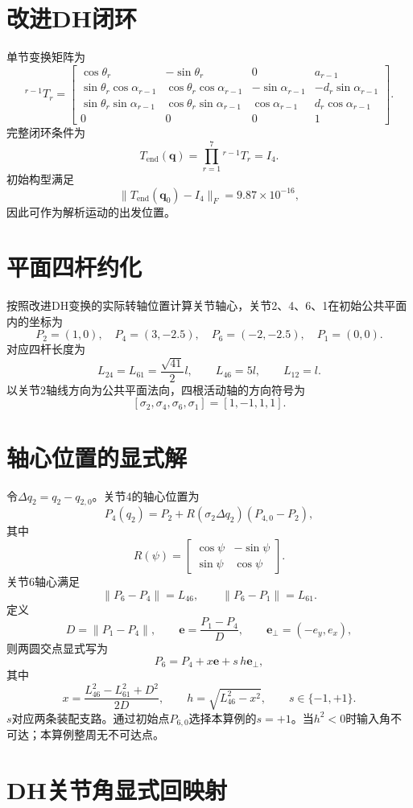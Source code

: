 \documentclass[UTF8,12pt,a4paper]{ctexart}
\begin{document}
\section{改进DH闭环}

单节变换矩阵为
\[
{}^{r-1}T_r=
\begin{bmatrix}
\cos\theta_r&-\sin\theta_r&0&a_{r-1}\\
\sin\theta_r\cos\alpha_{r-1}&\cos\theta_r\cos\alpha_{r-1}&-\sin\alpha_{r-1}&-d_r\sin\alpha_{r-1}\\
\sin\theta_r\sin\alpha_{r-1}&\cos\theta_r\sin\alpha_{r-1}&\cos\alpha_{r-1}&d_r\cos\alpha_{r-1}\\
0&0&0&1
\end{bmatrix}.
\]
完整闭环条件为
\[
T_{\mathrm{end}}(\bm q)=\prod_{r=1}^{7}{}^{r-1}T_r=I_4.
\]
初始构型满足
\[
\|T_{\mathrm{end}}(\bm q_0)-I_4\|_F=9.87\times10^{-16},
\]
因此可作为解析运动的出发位置。

\section{平面四杆约化}

按照改进DH变换的实际转轴位置计算关节轴心，关节2、4、6、1在初始公共平面内的坐标为
\[
P_2=(1,0),\quad P_4=(3,-2.5),\quad
P_6=(-2,-2.5),\quad P_1=(0,0).
\]
对应四杆长度为
\[
L_{24}=L_{61}=\frac{\sqrt{41}}{2}l,\qquad
L_{46}=5l,\qquad L_{12}=l.
\]
以关节2轴线方向为公共平面法向，四根活动轴的方向符号为
\[
[\sigma_2,\sigma_4,\sigma_6,\sigma_1]=[1,-1,1,1].
\]

\section{轴心位置的显式解}

令$\Delta q_2=q_2-q_{2,0}$。关节4的轴心位置为
\[
P_4(q_2)=P_2+R(\sigma_2\Delta q_2)(P_{4,0}-P_2),
\]
其中
\[
R(\psi)=
\begin{bmatrix}
\cos\psi&-\sin\psi\\
\sin\psi&\cos\psi
\end{bmatrix}.
\]
关节6轴心满足
\[
\|P_6-P_4\|=L_{46},\qquad \|P_6-P_1\|=L_{61}.
\]
定义
\[
D=\|P_1-P_4\|,\qquad
\bm e=\frac{P_1-P_4}{D},\qquad
\bm e_\perp=(-e_y,e_x),
\]
则两圆交点显式写为
\[
P_6=P_4+x\bm e+s\,h\bm e_\perp,
\]
其中
\[
x=\frac{L_{46}^{2}-L_{61}^{2}+D^{2}}{2D},
\qquad
h=\sqrt{L_{46}^{2}-x^{2}},
\qquad s\in\{-1,+1\}.
\]
$s$对应两条装配支路。通过初始点$P_{6,0}$选择本算例的$s=+1$。当$h^2<0$时输入角不可达；本算例整周无不可达点。

\section{DH关节角显式回映射}
\end{document}
